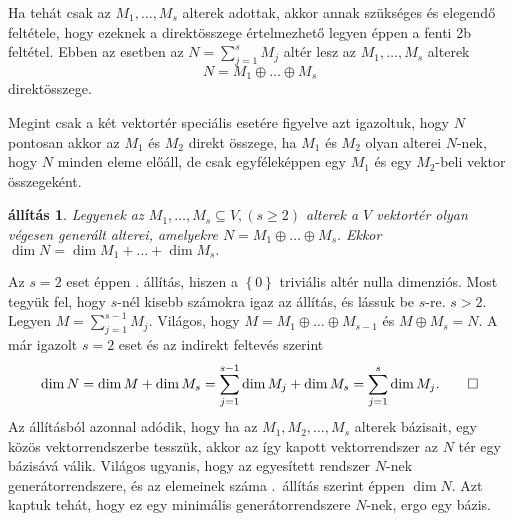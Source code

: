 \documentclass[9pt, a4paper, showtrims]{memoir}
\makeatletter
\renewenvironment{proof}[1][\proofname]
    {\par\pushQED{\qed}%
    \normalfont \topsep6\p@\@plus6\p@\relax
    \trivlist
    \item[\hskip\labelsep
        \itshape
    #1\@addpunct{:}]\ignorespaces}
    {\popQED\endtrivlist\@endpefalse}
\theoremstyle{plain}
\newtheorem{proposition}{állítás}[chapter]
\theoremstyle{remark}
\theoremstyle{definition}
\makeatother
\begin{document}
Ha tehát csak az $M_1,\dots,M_s$ alterek adottak,
akkor annak szükséges és elegendő feltétele, 
hogy ezeknek a direktösszege értelmezhető legyen éppen a fenti 2b feltétel.
Ebben az esetben az $N=\sum_{j=1}^sM_j$ altér lesz az $M_1,\dots,M_s$ alterek
\[
    N=M_1\oplus\dots\oplus M_s
\]
direktösszege.

Megint csak a két vektortér speciális esetére figyelve 
azt igazoltuk, hogy $N$ pontosan akkor az $M_1$ és $M_2$ direkt összege,
ha $M_1$ és $M_2$ olyan alterei $N$-nek, hogy $N$ minden eleme előáll,
de csak egyféleképpen egy $M_1$ és egy $M_2$-beli vektor összegeként.
\begin{proposition}\label{pr:drosszeg}
    Legyenek az $M_1,\dots,M_s\subseteq V, (s\geq 2)$ alterek a $V$ vektortér olyan végesen generált alterei,
    amelyekre 
    \(
        N=M_1\oplus\dots\oplus M_s.
    \)
    Ekkor 
    \(
        \dim N=
        \dim M_1+\dots+\dim M_s.
    \)
\end{proposition}
\begin{proof}
    Az $s=2$ eset éppen . állítás,
    hiszen a $\left\{ 0 \right\}$ triviális altér nulla dimenziós.
    Most tegyük fel, hogy $s$-nél kisebb számokra igaz az állítás, 
    és lássuk be $s$-re. $s>2.$
    Legyen $M=\sum_{j=1}^{s-1}M_j.$
    Világos, hogy $M=M_1\oplus\dots\oplus M_{s-1}$ és $M\oplus M_s=N$.
    A már igazolt $s=2$ eset és az indirekt feltevés szerint
    \[
        \dim N
        =
        \dim M+\dim M_s
        =
        \sum_{j=1}^{s-1}\dim M_j+\dim M_s
        =
        \sum_{j=1}^{s}\dim M_j.\qedhere
    \]
\end{proof}
Az állításból azonnal adódik,
hogy ha az $M_1, M_2, \dots,M_s$ alterek bázisait, egy közös vektorrendszerbe tesszük,
akkor az így kapott vektorrendszer az $N$ tér egy bázisává válik.
Világos ugyanis, hogy az egyesített rendszer $N$-nek generátorrendszere,
és az elemeinek száma .~állítás szerint éppen $\dim N$.
Azt kaptuk tehát, hogy ez egy minimális generátorrendszere $N$-nek,
ergo egy bázis.
\end{document}
